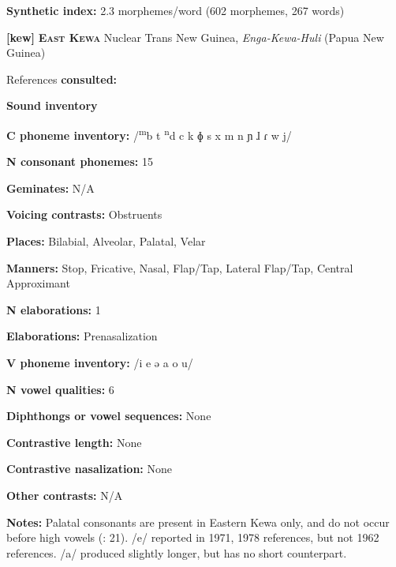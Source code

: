 \textbf{Synthetic index:} 2.3 morphemes/word (602 morphemes, 267 words)



\textbf{[kew]}   \textbf{\textsc{East Kewa}}  Nuclear Trans New Guinea, \textit{Enga-Kewa-Huli} (Papua New Guinea)



References \textbf{consulted:} \citet{Franklin1971,FranklinFranklin1962,FranklinFranklin1978}



\textbf{Sound inventory}



\textbf{C phoneme inventory:} /\textsuperscript{m}b t \textsuperscript{n}d c k ɸ s x m n ɲ ɺ ɾ w j/



\textbf{N consonant phonemes:} 15



\textbf{Geminates:} N/A



\textbf{Voicing contrasts:} Obstruents



\textbf{Places:} Bilabial, Alveolar, Palatal, Velar



\textbf{Manners:} Stop, Fricative, Nasal, Flap/Tap, Lateral Flap/Tap, Central Approximant



\textbf{N elaborations:} 1



\textbf{Elaborations:} Prenasalization



\textbf{V phoneme inventory:} /i e ə a o u/



\textbf{N vowel qualities:} 6



\textbf{Diphthongs or vowel sequences:} None



\textbf{Contrastive length:} None



\textbf{Contrastive nasalization:} None



\textbf{Other contrasts:} N/A



\textbf{Notes:} Palatal consonants are present in Eastern Kewa only, and do not occur before high vowels (\citealt{FranklinFranklin1978}: 21). /e/ reported in 1971, 1978 references, but not 1962 references. /a/ produced slightly longer, but has no short counterpart.



